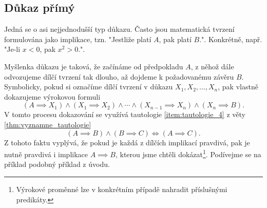 \subsection{Důkaz přímý}\label{subsec:dukaz_primy}
Jedná se o asi nejjednodušší typ důkazu. Často jsou matematická tvrzení formulována jako implikace, tzn. "Jestliže platí $A$, pak platí $B$.". Konkrétně, např. "Je-li $x<0$, pak $x^2>0$.".\par
Myšlenka důkazu je taková, že začínáme od předpokladu $A$, z něhož dále odvozujeme dílčí tvrzení tak dlouho, až dojdeme k požadovanému závěru $B$. Symbolicky, pokud si označíme dílčí tvrzení v důkazu $X_1, X_2, \dots, X_n$, pak vlastně dokazujeme výrokovou formuli
\begin{equation}\label{eq:primy_dukaz_formule}
    (A \implies X_1) \land (X_1 \implies X_2) \land \cdots \land (X_{n-1}\implies X_n) \land (X_n \implies B).
\end{equation}
V tomto procesu dokazování se využívá tautologie \ref{item:tautologie_4} z věty \ref{thm:vyznamne_tautologie}
\begin{equation*}
    (A \implies B) \land (B \implies C) \iff (A \implies C).
\end{equation*}
Z tohoto faktu vyplývá, že pokud je každá z dílčích implikací pravdivá, pak je nutně pravdivá i implikace $A \implies B$, kterou jsme chtěli dokázat\footnote{Výrokové proměnné lze v konkrétním případě nahradit příslušnými predikáty.}. Podívejme se na příklad podobný příklad z úvodu.

